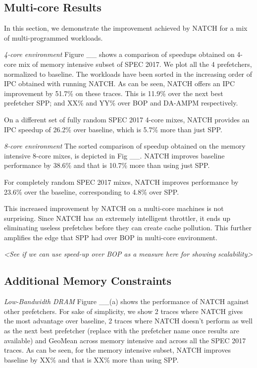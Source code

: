 \subsection{Multi-core Results}
\label{Results-Multi}
In this section, we demonstrate the improvement achieved by NATCH
for a mix of multi-programmed workloads.

\textit{4-core environment} Figure \_\_ shows a comparison of speedups
obtained on 4-core mix of memory intensive subset of SPEC 2017.  We
plot all the 4 prefetchers, normalized to baseline.  The workloads
have been sorted in the increasing order of IPC obtained with running NATCH.
As can be seen,
NATCH offers an IPC improvement by 51.7\% on these traces.  This is
11.9\% over the next best prefetcher SPP; and XX\% and YY\% over BOP
and DA-AMPM respectively.

On a different set of fully random SPEC 2017 4-core mixes, NATCH provides an IPC speedup of 
26.2\% over baseline, which is 5.7\% more than just SPP.

\textit{8-core environment} The sorted comparison of speedup obtained 
on the memory intensive 8-core mixes, is depicted in Fig \_\_.
NATCH improves baseline performance by 38.6\% and that is 10.7\% 
more than using just SPP.

For completely random SPEC 2017 mixes, NATCH improves performance by 
23.6\% over the baseline, corresponding to 4.8\% over SPP.

This increased improvement by NATCH on a multi-core machines is not
surprising.  Since NATCH has an extremely intelligent throttler, it ends up 
eliminating useless prefetches before they can create cache
pollution. This further amplifies the edge that SPP had over BOP in multi-core environment.
 
\textit{<See if we can use
speed-up over BOP as a measure here for showing scalability>}

\subsection{Additional Memory Constraints}
\label{Results-AdditionalMem}

\textit{Low-Bandwidth DRAM}
Figure \_\_(a) shows the performance of NATCH against other prefetchers. 
For sake of simplicity, we show 2 traces where NATCH gives the most advantage
over baseline, 2 traces where NATCH doesn't perform as well as the next
best prefetcher (replace with the prefetcher name once results are
available) and GeoMean across memory intensive and across all the 
SPEC 2017 traces. As can be seen, for the memory intensive subset,
 NATCH improves baseline by XX\% and that is XX\% more than using SPP.

